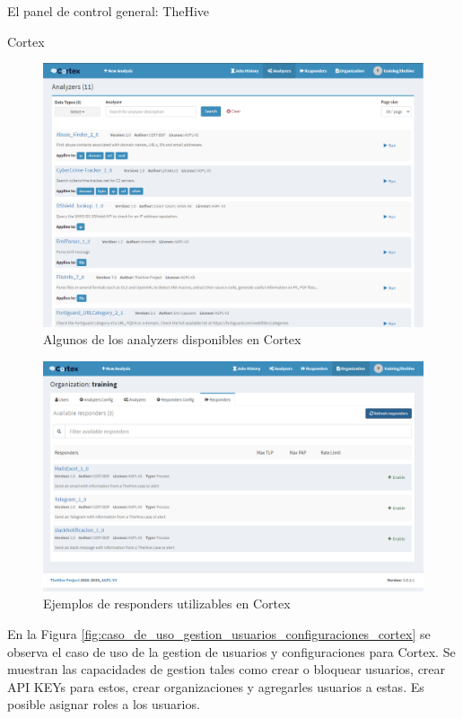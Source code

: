 \begin{section}{El panel de control general: TheHive }
\begin{subsection}{Cortex}
     \begin{figure}[H]
        \centering
        \includegraphics[width=1\textwidth]{./descripcion_sonion_imagenes/figura_26_analyzers_disponibles.png}
        \caption{Algunos de los analyzers disponibles en Cortex}
        \label{fig:analizers_disponibles}
     \end{figure}
     \begin{figure}[H]
        \centering
        \includegraphics[width=1\textwidth]{./descripcion_sonion_imagenes/figura_27_responders_cortex.png}
        \caption{Ejemplos de responders utilizables en Cortex}
        \label{fig:ejemplos_responders_cortex}
     \end{figure}  
     \FloatBarrier
     En la Figura \ref{fig:caso_de_uso_gestion_usuarios_configuraciones_cortex} se observa el caso de uso de la gestion de usuarios y configuraciones para Cortex. Se muestran las capacidades de gestion tales como crear o bloquear usuarios, crear API KEYs para estos, crear organizaciones y agregarles usuarios a estas. Es posible asignar roles a los usuarios.

\end{subsection}
\end{section}
